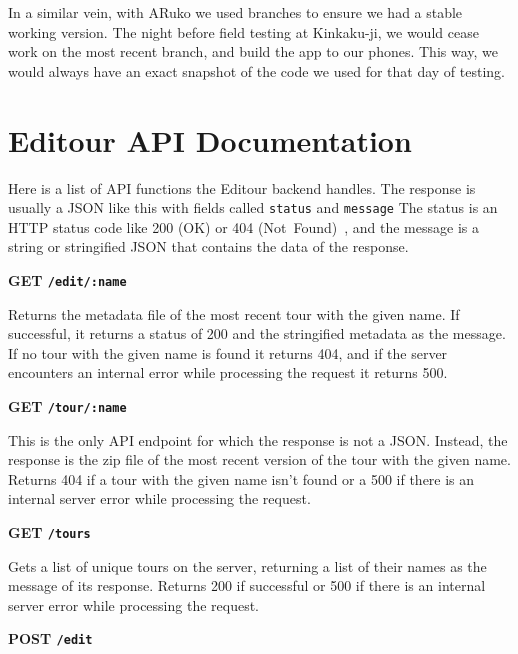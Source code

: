 \documentclass[a4paper, 10pt, american, titlepage]{article}
\newenvironment{indented}[1]%
{\begin{list}{}%
	{\setlength{\leftmargin}{#1}}%
	\item[]%
}
{\end{list}}
\begin{document}
In a similar vein, with ARuko we used branches to ensure we had a stable working
version. The night before field testing at Kinkaku-ji, we would cease work on
the most recent branch, and build the app to our phones. This way, we would
always have an exact snapshot of the code we used for that day of testing.

\clearpage

\section{Editour API Documentation}
\label{sec:editourAPIDocumentation}

Here is a list of API functions the Editour backend handles. The response is
usually a JSON like this with fields called \texttt{status} and \texttt{message}
The status is an HTTP status code like 200 (OK) or 404
(Not~Found)~\autocite{rfc7231}, and the message is a string or stringified JSON
that contains the data of the response.

\noindent\textbf{GET \texttt{/edit/:name}}

\begin{indented}{1cm}
	Returns the metadata file of the most recent tour with the given name. If
	successful, it returns a status of 200 and the stringified metadata as the
	message. If no tour with the given name is found it returns 404, and if the
	server encounters an internal error while processing the request it returns
	500.
\end{indented}

\noindent\textbf{GET \texttt{/tour/:name}}

\begin{indented}{1cm}
	This is the only API endpoint for which the response is not a JSON. Instead,
	the response is the zip file of the most recent version of the tour with the
	given name. Returns 404 if a tour with the given name isn't found or a 500
	if there is an internal server error while processing the request.
\end{indented}

\noindent\textbf{GET \texttt{/tours}}

\begin{indented}{1cm}
	Gets a list of unique tours on the server, returning a list of their names
	as the message of its response. Returns 200 if successful or 500 if there is
	an internal server error while processing the request.
\end{indented}

\noindent\textbf{POST \texttt{/edit}}
\end{document}
